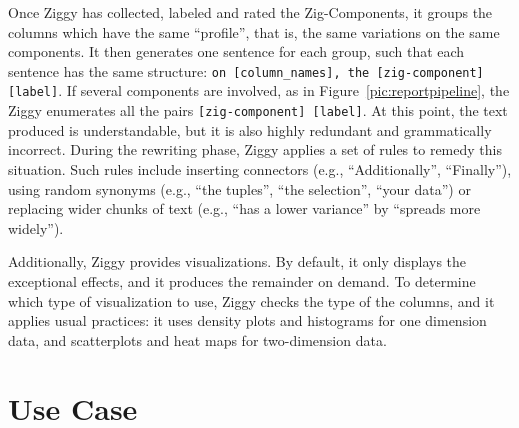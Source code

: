 Once Ziggy has collected, labeled and rated the Zig-Comp\-onents, it  groups
the columns which have the same ``profile'', that is, the same variations on the
same components. It then generates one sentence for each group, such that
each sentence has the same structure: \texttt{on [column\_names], the
[zig-component] [label]}. If several components are involved, as in
Figure~\ref{pic:reportpipeline}, the Ziggy enumerates all the pairs
\texttt{[zig-component] [label]}. At this point, the text produced is
understandable, but it is also highly redundant and grammatically incorrect. During the
rewriting phase, Ziggy applies a set of rules to remedy this situation. Such
rules include inserting connectors (e.g., ``Additionally'', ``Finally''), using
random synonyms (e.g., ``the tuples'', ``the selection'', ``your data'') or
replacing wider chunks of text (e.g., ``has a lower variance'' by ``spreads
more widely'').

Additionally, Ziggy provides visualizations. By default, it only displays the
exceptional effects, and it produces the remainder on demand. To determine
which type of visualization to use, Ziggy checks the type of the columns, and
it applies usual practices: it uses density plots and histograms for one
dimension data, and scatterplots and heat maps for two-dimension data.

\section{Use Case}
\label{sec:usecase}

